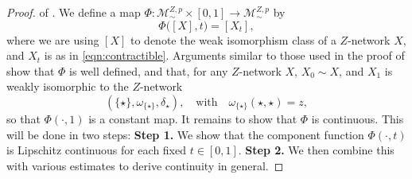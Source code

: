 \documentclass[twoside,11pt]{article}
\theoremstyle{definition}
\newcommand{\M}{\mathcal{M}}
\newcommand{\MZp}{\M_{\sim}^{Z,p}}
\begin{document}
\begin{proof}of .
  We define a map $\Phi:\MZp \times [0,1] \to \MZp$ by 
 \[
 \Phi\big([X],t) = [X_t],
 \]
 where we are using $[X]$ to denote the weak isomorphism class of a $Z$-network $X$, and $X_t$ is as in \eqref{eqn:contractible}. Arguments similar to those used in the proof of  show that $\Phi$ is well defined, and that, for any $Z$-network $X$, $X_0 \sim X$, and $X_1$ is weakly isomorphic to the $Z$-network 
 \[
 (\{\star\},\omega_{\{\star\}}, \delta_\star), \quad \mbox{with} \quad \omega_{\{\star\}}(\star,\star) = z,
 \]
 so that $\Phi(\cdot,1)$ is a constant map. It remains to show that $\Phi$ is continuous. This will be done in two steps: {\bf Step 1.} We show that the component function $\Phi(\cdot,t)$ is Lipschitz continuous for each fixed $t \in [0,1]$. {\bf Step 2.} We then combine this with various estimates to derive continuity in general.
 

\end{proof}
\end{document}
